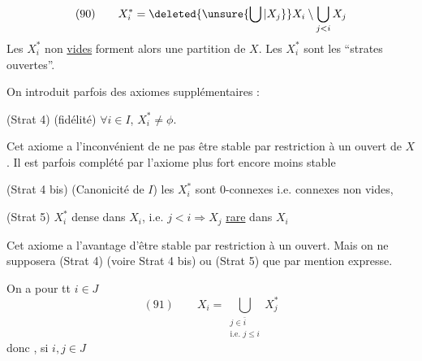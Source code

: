 
\[(90)\qquad X_i^*=\deleted{\unsure{\bigcup|X_j}}X_i\setminus\bigcup_{j<i}X_j\]
Les $X_i^*$ non \uline{vides} forment alors une partition de $X$. Les $X_i^*$ sont les ``strates ouvertes''.

On introduit parfois des axiomes supplémentaires :

(Strat 4) (fidélité) $\forall i\in I$, $X_i^*\neq\phi$.

Cet axiome a l'inconvénient de ne pas être stable par  restriction à un ouvert de $X$. Il est parfois complété par l'axiome plus fort encore moins stable

(Strat 4 bis) (Canonicité de $I$) les $X_i^*$ sont $0$-connexes i.e. connexes non vides,

(Strat 5)  $X_i^*$ dense dans $X_i$,  i.e. $j<i\Rightarrow X_j$ \uline{rare} dans $X_i$

Cet axiome a l'avantage d'être stable par restriction à un ouvert. Mais on ne supposera (Strat 4) (voire Strat 4 bis) ou (Strat 5) que par mention expresse.

On a pour tt $i\in J$
\[
(91)\qquad X_i=\bigcup_{\substack{j\in\bar i\\\text{i.e. }j\leq i}}X_j^*
\]
donc , si $i,j\in J$
